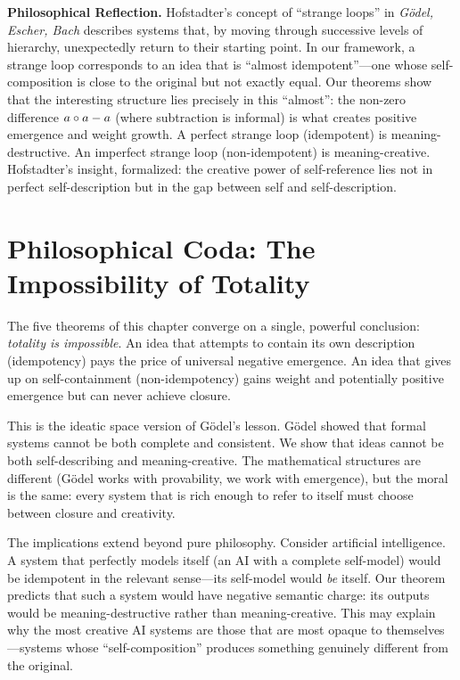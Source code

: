 \begin{reflectionbox}
\textbf{Philosophical Reflection.}
Hofstadter's concept of ``strange loops'' in \textit{G\"odel, Escher,
Bach} describes systems that, by moving through successive levels of
hierarchy, unexpectedly return to their starting point. In our framework,
a strange loop corresponds to an idea that is ``almost idempotent''---one
whose self-composition is close to the original but not exactly equal.
Our theorems show that the interesting structure lies precisely in this
``almost'': the non-zero difference $a \circ a - a$ (where
subtraction is informal) is what creates positive emergence and weight
growth. A perfect strange loop (idempotent) is meaning-destructive.
An imperfect strange loop (non-idempotent) is meaning-creative.
Hofstadter's insight, formalized: the creative power of self-reference
lies not in perfect self-description but in the gap between self and
self-description.
\end{reflectionbox}

\section{Philosophical Coda: The Impossibility of Totality}

The five theorems of this chapter converge on a single, powerful
conclusion: \emph{totality is impossible}. An idea that attempts to
contain its own description (idempotency) pays the price of universal
negative emergence. An idea that gives up on self-containment
(non-idempotency) gains weight and potentially positive emergence but
can never achieve closure.

This is the ideatic space version of G\"odel's lesson. G\"odel showed
that formal systems cannot be both complete and consistent. We show that
ideas cannot be both self-describing and meaning-creative. The
mathematical structures are different (G\"odel works with provability,
we work with emergence), but the moral is the same: every system that
is rich enough to refer to itself must choose between closure and
creativity.

The implications extend beyond pure philosophy. Consider artificial
intelligence. A system that perfectly models itself (an AI with a
complete self-model) would be idempotent in the relevant sense---its
self-model would \emph{be} itself. Our theorem predicts that such a
system would have negative semantic charge: its outputs would be
meaning-destructive rather than meaning-creative. This may explain why
the most creative AI systems are those that are most opaque to
themselves---systems whose ``self-composition'' produces something
genuinely different from the original.

